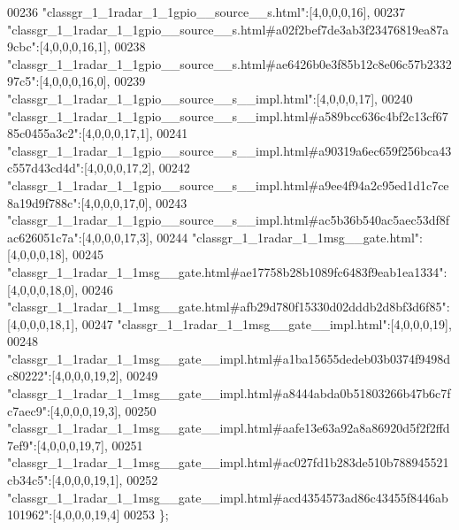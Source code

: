 \begin{DoxyCode}
00236 \textcolor{stringliteral}{"classgr\_1\_1radar\_1\_1gpio\_\_source\_\_s.html"}:[4,0,0,0,16],
00237 \textcolor{stringliteral}{"classgr\_1\_1radar\_1\_1gpio\_\_source\_\_s.html#a02f2bef7de3ab3f23476819ea87a9cbc"}:[4,0,0,0,16,1],
00238 \textcolor{stringliteral}{"classgr\_1\_1radar\_1\_1gpio\_\_source\_\_s.html#ae6426b0e3f85b12c8e06c57b233297c5"}:[4,0,0,0,16,0],
00239 \textcolor{stringliteral}{"classgr\_1\_1radar\_1\_1gpio\_\_source\_\_s\_\_impl.html"}:[4,0,0,0,17],
00240 \textcolor{stringliteral}{"classgr\_1\_1radar\_1\_1gpio\_\_source\_\_s\_\_impl.html#a589bcc636c4bf2c13cf6785c0455a3c2"}:[4,0,0,0,17,1],
00241 \textcolor{stringliteral}{"classgr\_1\_1radar\_1\_1gpio\_\_source\_\_s\_\_impl.html#a90319a6ec659f256bca43c557d43cd4d"}:[4,0,0,0,17,2],
00242 \textcolor{stringliteral}{"classgr\_1\_1radar\_1\_1gpio\_\_source\_\_s\_\_impl.html#a9ee4f94a2c95ed1d1c7ce8a19d9f788c"}:[4,0,0,0,17,0],
00243 \textcolor{stringliteral}{"classgr\_1\_1radar\_1\_1gpio\_\_source\_\_s\_\_impl.html#ac5b36b540ac5aec53df8fac626051c7a"}:[4,0,0,0,17,3],
00244 \textcolor{stringliteral}{"classgr\_1\_1radar\_1\_1msg\_\_gate.html"}:[4,0,0,0,18],
00245 \textcolor{stringliteral}{"classgr\_1\_1radar\_1\_1msg\_\_gate.html#ae17758b28b1089fc6483f9eab1ea1334"}:[4,0,0,0,18,0],
00246 \textcolor{stringliteral}{"classgr\_1\_1radar\_1\_1msg\_\_gate.html#afb29d780f15330d02dddb2d8bf3d6f85"}:[4,0,0,0,18,1],
00247 \textcolor{stringliteral}{"classgr\_1\_1radar\_1\_1msg\_\_gate\_\_impl.html"}:[4,0,0,0,19],
00248 \textcolor{stringliteral}{"classgr\_1\_1radar\_1\_1msg\_\_gate\_\_impl.html#a1ba15655dedeb03b0374f9498dc80222"}:[4,0,0,0,19,2],
00249 \textcolor{stringliteral}{"classgr\_1\_1radar\_1\_1msg\_\_gate\_\_impl.html#a8444abda0b51803266b47b6c7fc7aec9"}:[4,0,0,0,19,3],
00250 \textcolor{stringliteral}{"classgr\_1\_1radar\_1\_1msg\_\_gate\_\_impl.html#aafe13e63a92a8a86920d5f2f2ffd7ef9"}:[4,0,0,0,19,7],
00251 \textcolor{stringliteral}{"classgr\_1\_1radar\_1\_1msg\_\_gate\_\_impl.html#ac027fd1b283de510b788945521cb34c5"}:[4,0,0,0,19,1],
00252 \textcolor{stringliteral}{"classgr\_1\_1radar\_1\_1msg\_\_gate\_\_impl.html#acd4354573ad86c43455f8446ab101962"}:[4,0,0,0,19,4]
00253 \};
\end{DoxyCode}
